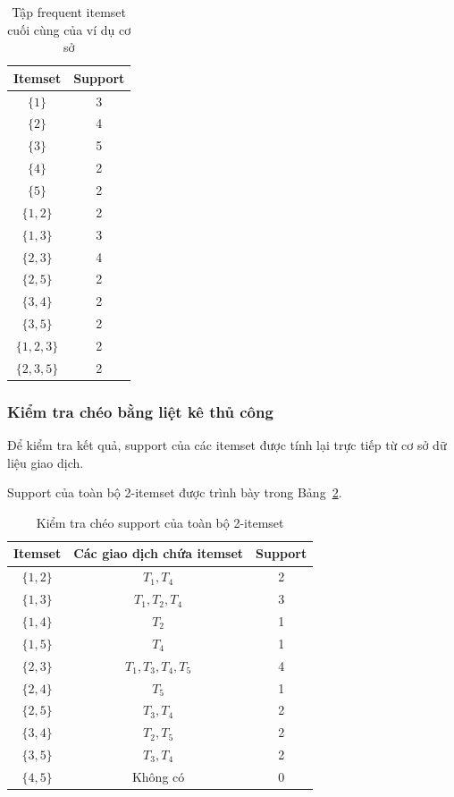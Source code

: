 \begin{table}[H]
\centering
\caption{Tập frequent itemset cuối cùng của ví dụ cơ sở}
\label{tab:basic-final-fi}
\begin{tabular}{cc}
\toprule
Itemset & Support \\
\midrule
$\{1\}$ & 3 \\
$\{2\}$ & 4 \\
$\{3\}$ & 5 \\
$\{4\}$ & 2 \\
$\{5\}$ & 2 \\
$\{1,2\}$ & 2 \\
$\{1,3\}$ & 3 \\
$\{2,3\}$ & 4 \\
$\{2,5\}$ & 2 \\
$\{3,4\}$ & 2 \\
$\{3,5\}$ & 2 \\
$\{1,2,3\}$ & 2 \\
$\{2,3,5\}$ & 2 \\
\bottomrule
\end{tabular}
\end{table}

\subsubsection{Kiểm tra chéo bằng liệt kê thủ công}

Để kiểm tra kết quả, support của các itemset được tính lại trực tiếp từ cơ sở dữ liệu giao dịch.

Support của toàn bộ 2-itemset được trình bày trong Bảng~\ref{tab:basic-crosscheck-pairs}.

\begin{table}[H]
\centering
\caption{Kiểm tra chéo support của toàn bộ 2-itemset}
\label{tab:basic-crosscheck-pairs}
\begin{tabular}{ccc}
\toprule
Itemset & Các giao dịch chứa itemset & Support \\
\midrule
$\{1,2\}$ & $T_1,T_4$ & 2 \\
$\{1,3\}$ & $T_1,T_2,T_4$ & 3 \\
$\{1,4\}$ & $T_2$ & 1 \\
$\{1,5\}$ & $T_4$ & 1 \\
$\{2,3\}$ & $T_1,T_3,T_4,T_5$ & 4 \\
$\{2,4\}$ & $T_5$ & 1 \\
$\{2,5\}$ & $T_3,T_4$ & 2 \\
$\{3,4\}$ & $T_2,T_5$ & 2 \\
$\{3,5\}$ & $T_3,T_4$ & 2 \\
$\{4,5\}$ & Không có & 0 \\
\bottomrule
\end{tabular}
\end{table}

